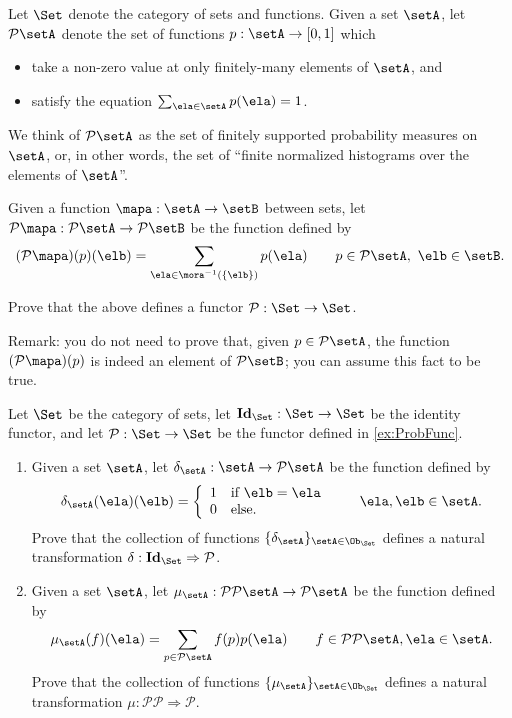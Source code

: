 \documentclass[paper=8.125in:10.250in,pagesize=pdftex,
    headinclude=false,footinclude=false,oneside,egregdoesnotlikesansseriftitles]{kaobook}
\begin{document}
\begin{gradedexercise}\label{ex:ProbFunc}
Let $\Set$ denote the category of sets and functions. 
Given a set $\setA$, let $\mathcal{P} \setA$ denote the set of functions $p: \setA \to [0,1]$ which 
\begin{itemize}
\item take a non-zero value at only finitely-many elements of $\setA$, and 
\item satisfy the equation $\sum_{\ela \in \setA} p(\ela) = 1$. 
\end{itemize}
We think of $\mathcal{P} \setA$ as the set of finitely supported probability measures on $\setA$, or, in other words, the set of ``finite normalized histograms over the elements of $\setA$''. 

Given a function $\mapa: \setA \to \setB$ between sets, let $\mathcal{P} \mapa: \mathcal{P}\setA \to \mathcal{P}\setB$ be the function defined by 
$$ (\mathcal{P} \mapa)(p)(\elb) = \sum_{\ela \in \mora^{-1}(\{ \elb \})} p(\ela) \quad \quad  p \in \mathcal{P}\setA, \  \elb \in \setB.$$

Prove that the above defines a functor $\mathcal{P}: \Set \to \Set$. 

Remark: you do not need to prove that, given $p \in \mathcal{P}\setA$, the function $(\mathcal{P} \mapa)(p)$ is indeed an element of $\mathcal{P}\setB$; you can assume this fact to be true. 
\end{gradedexercise}


\newpage


\begin{gradedexercise}\label{ex:ProbNatTrafos}
Let $\Set$ be the category of sets, let $\mathbf{Id}_\Set : \Set \to \Set$ be the identity functor, and let $\mathcal{P}: \Set \to \Set$ be the functor defined in \cref{ex:ProbFunc}. 
\begin{enumerate}
\item Given a set $\setA$, let $\delta_{\setA} : \setA \to \mathcal{P} \setA$ be the function defined by
$$\delta_\setA (\ela)(\elb) = \left\{\begin{array}{ll}
        1 & \text{if } \elb = \ela \\
        0 & \text{else.} 
        \end{array}\right. 
  \quad \quad \ela, \elb \in \setA.$$
Prove that the collection of functions $\{ \delta_{\setA} \}_{\setA \in \Ob_{\Set}}$ defines a natural transformation $\delta: \mathbf{Id}_\Set \Rightarrow \mathcal{P}$. 
\item Given a set $\setA$, let $\mu_\setA : \mathcal{P} \mathcal{P} \setA \to \mathcal{P} \setA$ be the function defined by 
$$\mu_\setA (f)(\ela) = \sum_{p \in \mathcal{P} \setA} f(p) p(\ela) \quad \quad f \in \mathcal{P} \mathcal{P} \setA, \ela \in \setA.$$
Prove that the collection of functions $\{ \mu_{\setA} \}_{\setA \in \Ob_{\Set}}$ defines a natural transformation $\mu: \mathcal{P} \mathcal{P} \Rightarrow \mathcal{P}$. 
\end{enumerate}
\end{gradedexercise}
\end{document}
